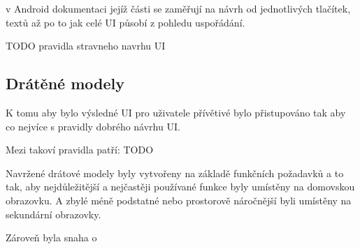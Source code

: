 v Android dokumentaci jejíž části se zaměřují na návrh od jednotlivých tlačítek, textů až po to jak celé UI působí z pohledu
uspořádání.



TODO pravidla stravneho navrhu UI

\subsection{Drátěné modely} \label{navrhWireframes}
K tomu aby bylo výsledné UI pro uživatele přívětivé bylo přistupováno tak aby co nejvíce  s pravidly dobrého návrhu UI.

Mezi takoví pravidla patří:
TODO

Navržené drátové modely byly vytvořeny na základě funkčních požadavků a to tak, aby nejdůležitější a nejčastěji používané funkce byly 
umístěny na domovskou obrazovku. A zbylé méně podstatné nebo prostorově náročnější byli umístěny na sekundární obrazovky.

Zároveň byla snaha o 

